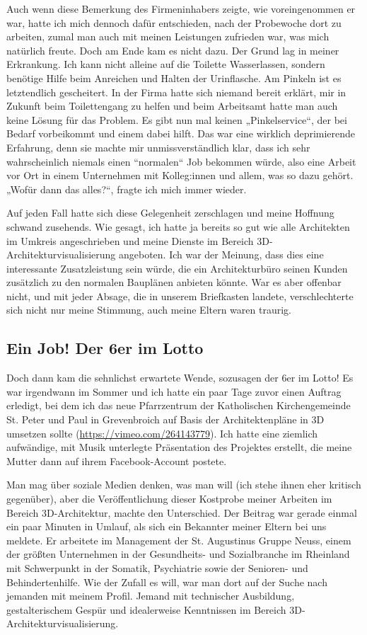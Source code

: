 \documentclass[fontsize=14pt,a4paper,headinclude,DIV=calc,automark]{scrbook}
\begin{document}
Auch wenn diese Bemerkung des Firmeninhabers zeigte, wie voreingenommen er war, hatte ich mich dennoch dafür entschieden, nach der Probewoche dort zu arbeiten, zumal man auch mit meinen Leistungen zufrieden war, was mich natürlich freute. Doch am Ende kam es nicht dazu. Der Grund lag in meiner Erkrankung. Ich kann nicht alleine auf die Toilette Wasserlassen, sondern benötige Hilfe beim Anreichen und Halten der Urinflasche. Am Pinkeln ist es letztendlich gescheitert. In der Firma hatte sich niemand bereit erklärt, mir in Zukunft beim Toilettengang zu helfen und beim Arbeitsamt hatte man auch keine Lösung für das Problem. Es gibt nun mal keinen „Pinkelservice“, der bei Bedarf vorbeikommt und einem dabei hilft. Das war eine wirklich deprimierende Erfahrung, denn sie machte mir unmissverständlich klar, dass ich sehr wahrscheinlich niemals einen “normalen“ Job bekommen würde, also eine Arbeit vor Ort in einem Unternehmen mit Kolleg:innen und allem, was so dazu gehört. „Wofür dann das alles?“, fragte ich mich immer wieder.

Auf jeden Fall hatte sich diese Gelegenheit zerschlagen und meine Hoffnung schwand zusehends. Wie gesagt, ich hatte ja bereits so gut wie alle Architekten im Umkreis angeschrieben und meine Dienste im Bereich 3D-Architekturvisualisierung angeboten. Ich war der Meinung, dass dies eine interessante Zusatzleistung sein würde, die ein Architekturbüro seinen Kunden zusätzlich zu den normalen Bauplänen anbieten könnte. War es aber offenbar nicht, und mit jeder Absage, die in unserem Briefkasten landete, verschlechterte sich nicht nur meine Stimmung, auch meine Eltern waren traurig.

\subsection{Ein Job! Der 6er im Lotto}

Doch dann kam die sehnlichst erwartete Wende, sozusagen der 6er im Lotto! Es war irgendwann im Sommer und ich hatte ein paar Tage zuvor einen Auftrag erledigt, bei dem ich das neue Pfarrzentrum der Katholischen Kirchengemeinde St. Peter und Paul in Grevenbroich auf Basis der Architektenpläne in 3D umsetzen sollte (\url{https://vimeo.com/264143779}). Ich hatte eine ziemlich aufwändige, mit Musik unterlegte Präsentation des Projektes erstellt, die meine Mutter dann auf ihrem Facebook-Account postete.

Man mag über soziale Medien denken, was man will (ich stehe ihnen eher kritisch gegenüber), aber die Veröffentlichung dieser Kostprobe meiner Arbeiten im Bereich 3D-Architektur, machte den Unterschied. Der Beitrag war gerade einmal ein paar Minuten in Umlauf, als sich ein Bekannter meiner Eltern bei uns meldete. Er arbeitete im Management der St. Augustinus Gruppe Neuss, einem der größten Unternehmen in der Gesundheits- und Sozialbranche im Rheinland mit Schwerpunkt in der Somatik, Psychiatrie sowie der Senioren- und Behindertenhilfe. Wie der Zufall es will, war man dort auf der Suche nach jemanden mit meinem Profil. Jemand mit technischer Ausbildung, gestalterischem Gespür und idealerweise Kenntnissen im Bereich 3D-Architekturvisualisierung.
\end{document}
